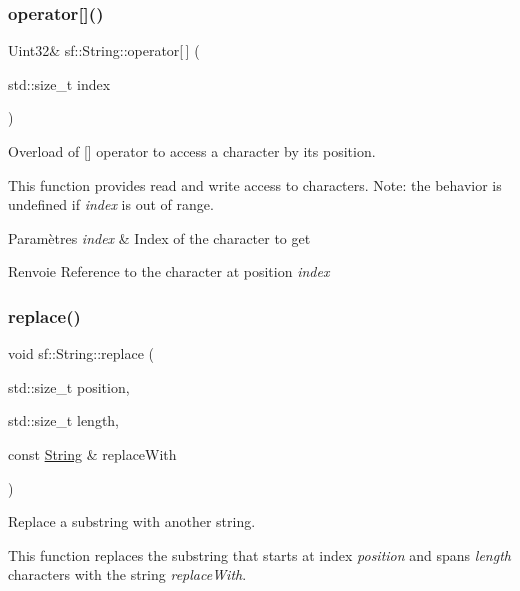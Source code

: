 \subsubsection{\texorpdfstring{operator[]()}{operator[]()}\hspace{0.1cm}{\footnotesize\ttfamily [2/2]}}
{\footnotesize\ttfamily Uint32\& sf\+::\+String\+::operator\mbox{[}$\,$\mbox{]} (\begin{DoxyParamCaption}\item[{std\+::size\+\_\+t}]{index }\end{DoxyParamCaption})}



Overload of \mbox{[}\mbox{]} operator to access a character by its position. 

This function provides read and write access to characters. Note\+: the behavior is undefined if {\itshape index} is out of range.


\begin{DoxyParams}{Paramètres}
{\em index} & Index of the character to get\\
\hline
\end{DoxyParams}
\begin{DoxyReturn}{Renvoie}
Reference to the character at position {\itshape index} 
\end{DoxyReturn}
\mbox{\label{classsf_1_1String_ad460e628c287b0fa88deba2eb0b6744b}} 
\subsubsection{\texorpdfstring{replace()}{replace()}\hspace{0.1cm}{\footnotesize\ttfamily [1/2]}}
{\footnotesize\ttfamily void sf\+::\+String\+::replace (\begin{DoxyParamCaption}\item[{std\+::size\+\_\+t}]{position,  }\item[{std\+::size\+\_\+t}]{length,  }\item[{const \hyperlink{classsf_1_1String}{String} \&}]{replace\+With }\end{DoxyParamCaption})}



Replace a substring with another string. 

This function replaces the substring that starts at index {\itshape position} and spans {\itshape length} characters with the string {\itshape replace\+With}.


